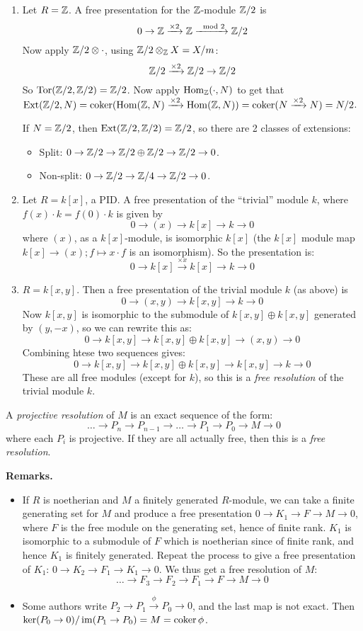 \documentclass[10pt,a4paper]{article}
\begin{document}
\begin{enumerate}
  \item Let $R = \mathbb{Z}$. A free presentation for the $\mathbb{Z}$-module $\mathbb{Z}/2$ is
  \[0 \to \mathbb{Z} \xrightarrow{\times 2} \mathbb{Z} \xrightarrow{\mod 2} \mathbb{Z}/2\]
  Now apply $\mathbb{Z}/2 \otimes \cdot$, using $\mathbb{Z}/2 \otimes_{\mathbb{Z}} X = X/m$:
  \[\mathbb{Z}/2 \xrightarrow{\times 2} \mathbb{Z}/2 \to \mathbb{Z}/2\]
  So $\operatorname{Tor}(\mathbb{Z}/2, \mathbb{Z}/2) = \mathbb{Z}/2$. Now apply $\operatorname{Hom}_{\mathbb{Z}}(\cdot, N)$ to get that $\operatorname{Ext}(\mathbb{Z}/2, N) = \operatorname{coker}(\operatorname{Hom}(\mathbb{Z}, N)\xrightarrow{\times 2}\operatorname{Hom}(\mathbb{Z}, N)) = \operatorname{coker}(N \xrightarrow{\times 2} N) = N/2$.

  If $N = \mathbb{Z}/2$, then $\operatorname{Ext}(\mathbb{Z}/2, \mathbb{Z}/2) = \mathbb{Z}/2$, so there are 2 classes of extensions:
  \begin{itemize}
    \item Split: $0 \to \mathbb{Z}/2 \to \mathbb{Z}/2 \oplus \mathbb{Z}/2 \to \mathbb{Z}/2 \to 0$.
    \item Non-split: $0 \to \mathbb{Z}/2 \to \mathbb{Z}/4 \to \mathbb{Z}/2 \to 0$.
  \end{itemize}
  \item Let $R = k[x]$, a PID. A free presentation of the ``trivial'' module $k$, where $f(x)\cdot k = f(0)\cdot k$ is given by
  \[0 \to (x) \to k[x] \to k \to 0\]
  where $(x)$, as a $k[x]$-module, is isomorphic $k[x]$ (the $k[x]$ module map $k[x]\to (x); f \mapsto x\cdot f$ is an isomorphism). So the presentation is:
  \[0 \to k[x] \xrightarrow{\times x} k[x] \to k \to 0\]
  \item $R = k[x,y]$. Then a free presentation of the trivial module $k$ (as above) is
  \[0 \to (x,y) \to k[x,y] \to k \to 0\]
  Now $k[x,y]$ is isomorphic to the submodule of $k[x,y] \oplus k[x,y]$ generated by $(y, -x)$, so we can rewrite this as:
  \[0 \to k[x,y] \to k[x,y]\oplus k[x,y] \to (x,y) \to 0\]
  Combining htese two sequences gives:
  \[0 \to k[x,y] \to k[x,y]\oplus k[x,y] \to k[x,y] \to k \to 0\]
  These are all free modules (except for $k$), so this is a \emph{free resolution} of the trivial module $k$.
\end{enumerate}
\begin{definition}
  A \emph{projective resolution} of $M$ is an exact sequence of the form:
  \[\ldots \to P_n \to P_{n-1} \to \ldots \to P_1 \to P_0 \to M \to 0\]
  where each $P_i$ is projective. If they are all actually free, then this is a \emph{free resolution}.
\end{definition}
\textbf{Remarks.}
\begin{itemize}
  \item If $R$ is noetherian and $M$ a finitely generated $R$-module, we can take a finite generating set for $M$ and produce a free presentation $0\to K_1 \to F \to M \to 0$, where $F$ is the free module on the generating set, hence of finite rank. $K_1$ is isomorphic to a submodule of $F$ which is noetherian since of finite rank, and hence $K_1$ is finitely generated. Repeat the process to give a free presentation of $K_1$: $0 \to K_2 \to F_1 \to K_1 \to 0$. We thus get a free resolution of $M$:
  \[\ldots \to F_3 \to F_2 \to F_1 \to F \to M \to 0\]
  \item Some authors write $P_2 \to P_1 \xrightarrow{\phi} P_0 \to 0$, and the last map is not exact. Then $\ker(P_0 \to 0)/\operatorname{im}(P_1 \to P_0) = M = \operatorname{coker} \phi$.
\end{itemize}
\end{document}
